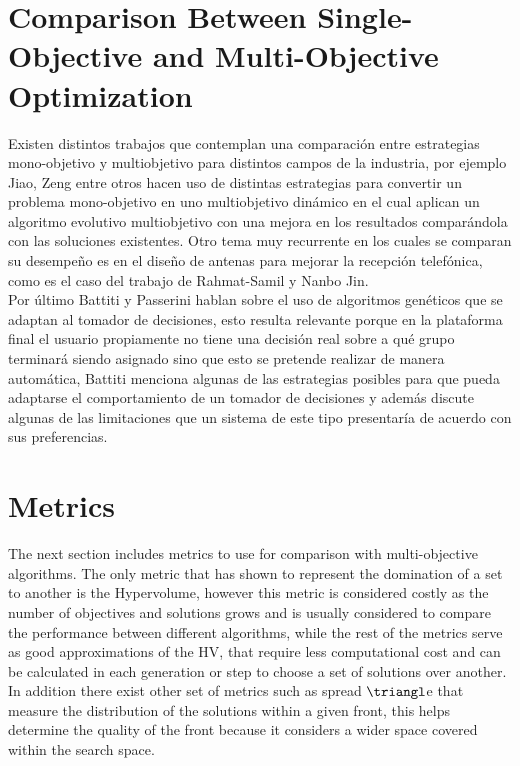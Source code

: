 \section{Comparison Between Single-Objective and Multi-Objective Optimization}
Existen distintos trabajos que contemplan una comparación entre estrategias mono-objetivo y multiobjetivo para distintos campos de la industria, por ejemplo Jiao, Zeng\cite{Jiao2017DynamicME} entre otros hacen uso de distintas estrategias para convertir un problema mono-objetivo en uno multiobjetivo dinámico en el cual aplican un algoritmo evolutivo multiobjetivo con una mejora en los resultados comparándola con las soluciones existentes. Otro tema muy recurrente en los cuales se comparan su desempeño es en el diseño de antenas para mejorar la recepción telefónica, como es el caso del trabajo de Rahmat-Samil y Nanbo Jin.\cite{Jin2007-qu}\\ 

Por último Battiti y Passerini\cite{Battiti2010-xo} hablan sobre el uso de algoritmos genéticos que se adaptan al tomador de decisiones, esto resulta relevante porque en la plataforma final el usuario propiamente no tiene una decisión real sobre a qué grupo terminará siendo asignado sino que esto se pretende realizar de manera automática, Battiti menciona algunas de las estrategias posibles para que pueda adaptarse el comportamiento de un tomador de decisiones y además discute algunas de las limitaciones que un sistema de este tipo presentaría de acuerdo con sus preferencias.\cite{Wang2010-zh}\\

\section{Metrics}

The next section includes metrics to use for comparison with multi-objective algorithms. The only metric that has shown to represent the domination of a set to another is the Hypervolume, however this metric is considered costly as the number of objectives and solutions grows and is usually considered to compare the performance between different algorithms, while the rest of the metrics serve as good approximations of the HV, that require less computational cost and can be calculated in each generation or step to choose a set of solutions over another. In addition there exist other set of metrics such as spread $\triangl$e that measure the distribution of the solutions within a given front, this helps determine the quality of the front because it considers a wider space covered within the search space.


